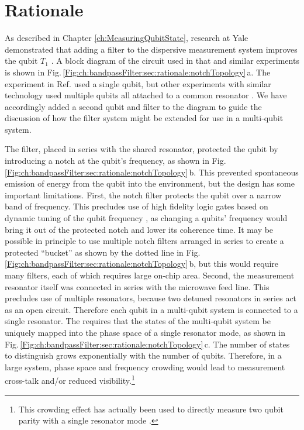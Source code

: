 \section{Rationale}

As described in Chapter \ref{ch:MeasuringQubitState}, research at Yale demonstrated that adding a filter to the dispersive measurement system improves the qubit $T_1$ \cite{Reed:filter2010}.
A block diagram of the circuit used in that and similar experiments is shown in Fig.\,\ref{Fig:ch:bandpassFilter:sec:rationale:notchTopology}\,a.
The experiment in Ref. \cite{Reed:filter2010} used a single qubit, but other experiments with similar technology used multiple qubits all attached to a common resonator \cite{DiCarlo:algorithms2009, Majer:bus2007, Reed:errorCorrection2012}.
We have accordingly added a second qubit and filter to the diagram to guide the discussion of how the filter system might be extended for use in a multi-qubit system.

The filter, placed in series with the shared resonator, protected the qubit by introducing a notch at the qubit's frequency, as shown in Fig.\,\ref{Fig:ch:bandpassFilter:sec:rationale:notchTopology}\,b.
This prevented spontaneous emission of energy from the qubit into the environment, but the design has some important limitations.
First, the notch filter protects the qubit over a narrow band of frequency.
This precludes use of high fidelity logic gates based on dynamic tuning of the qubit frequency \cite{Barends:gates2014}, as changing a qubits' frequency would bring it out of the protected notch and lower its coherence time.
It may be possible in principle to use multiple notch filters arranged in series to create a protected ``bucket'' as shown by the dotted line in Fig.\,\ref{Fig:ch:bandpassFilter:sec:rationale:notchTopology}\,b, but this would require many filters, each of which requires large on-chip area.
Second, the measurement resonator itself was connected in series with the microwave feed line.
This precludes use of multiple resonators, because two detuned resonators in series act as an open circuit.
Therefore each qubit in a multi-qubit system is connected to a single resonator.
The requires that the states of the multi-qubit system be uniquely mapped into the phase space of a single resonator mode, as shown in Fig.\,\ref{Fig:ch:bandpassFilter:sec:rationale:notchTopology}\,c.
The number of states to distinguish grows exponentially with the number of qubits.
Therefore, in a large system, phase space and frequency crowding would lead to measurement cross-talk and/or reduced visibility.\footnote{This crowding effect has actually been used to directly measure two qubit parity with a single resonator mode \cite{Chow:jointReadout2010}.}

